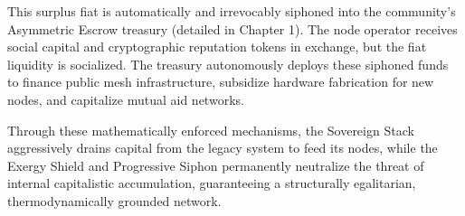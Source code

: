 This surplus fiat is automatically and irrevocably siphoned into the community's Asymmetric Escrow treasury (detailed in Chapter 1). The node operator receives social capital and cryptographic reputation tokens in exchange, but the fiat liquidity is socialized. The treasury autonomously deploys these siphoned funds to finance public mesh infrastructure, subsidize hardware fabrication for new nodes, and capitalize mutual aid networks. 

Through these mathematically enforced mechanisms, the Sovereign Stack aggressively drains capital from the legacy system to feed its nodes, while the Exergy Shield and Progressive Siphon permanently neutralize the threat of internal capitalistic accumulation, guaranteeing a structurally egalitarian, thermodynamically grounded network.
